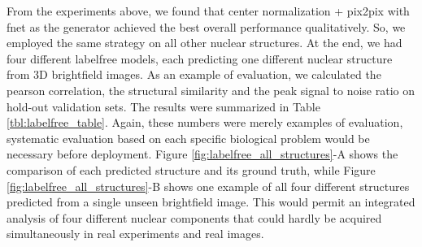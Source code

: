 From the experiments above, we found that center normalization + pix2pix with fnet as the generator achieved the best overall performance qualitatively. So, we employed the same strategy on all other nuclear structures. At the end, we had four different labelfree models, each predicting one different nuclear structure from 3D brightfield images. As an example of evaluation, we calculated the pearson correlation, the structural similarity and the peak signal to noise ratio on hold-out validation sets. The results were summarized in Table \ref{tbl:labelfree_table}. Again, these numbers were merely examples of evaluation, systematic evaluation based on each specific biological problem would be necessary before deployment. Figure \ref{fig:labelfree_all_structures}-A shows the comparison of each predicted structure and its ground truth, while Figure \ref{fig:labelfree_all_structures}-B shows one example of all four different structures predicted from a single unseen brightfield image. This would permit an integrated analysis of four different nuclear components that could hardly be acquired simultaneously in real experiments and real images.

